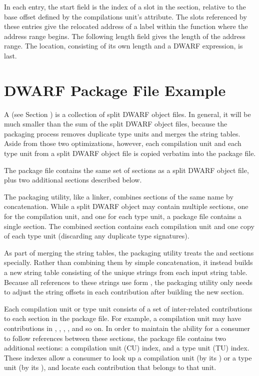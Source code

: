 In each \DWLLEstartlength{} entry, 
the start field is the index
of a slot in the \dotdebugaddr{} section, relative to the base
offset defined by the compilations unit's \DWATaddrbase{}
attribute. The \dotdebugaddr{} slots referenced by these entries give
the relocated address of a label within the function where the
address range begins. 
The following length field gives the length of the
address range. The location, consisting of its own length and
a DWARF expression, is last.

\clearpage
\section{DWARF Package File Example}
\label{app:dwarfpackagefileexample}

A  
(see Section ) 
is a collection of split DWARF object files.
In general, it will be much smaller than the sum of the split
DWARF object files, because the packaging process removes duplicate
type units and merges the string tables. Aside from those two
optimizations, however, each compilation unit and each type unit
from a split DWARF object file is copied verbatim into the package
file.

The package file contains the same set of sections as a split
DWARF object file, plus two additional sections described below.

The packaging utility, like a linker, combines sections of the
same name by concatenation. While a split DWARF object may
contain multiple \dotdebuginfodwo{} sections, one for the
compilation unit, and one for each type unit, a package file
contains a single \dotdebuginfodwo{} section. The combined
\dotdebuginfodwo{} section contains each compilation unit and one
copy of each type unit (discarding any duplicate type
signatures).

As part of merging the string tables, the packaging utility
treats the \dotdebugstrdwo{} and \dotdebugstroffsetsdwo{}
sections specially. Rather than
combining them by simple concatenation, it instead builds a new
string table consisting of the unique strings from each input
string table. Because all references to these strings use
form \DWFORMstrx{},
the packaging utility only needs to adjust the
string offsets in each \dotdebugstroffsetsdwo{} contribution after
building the new \dotdebugstrdwo{} section.

Each compilation unit or type unit consists of a set of
inter-related contributions to each section in the package file.
For example, a compilation unit may have contributions in
\dotdebuginfodwo{}, \dotdebugabbrevdwo{}, \dotdebuglinedwo{},
\dotdebugstroffsetsdwo{}, and so on. In order to maintain the ability 
for a consumer to follow references between these sections, the
package file contains two additional sections: a compilation unit
(CU) index, and a type unit (TU) index. These indexes allow a
consumer to look up a compilation unit (by its \CUsignature) or 
a type unit (by its \TUsignature), and locate each contribution 
that belongs to that unit.

